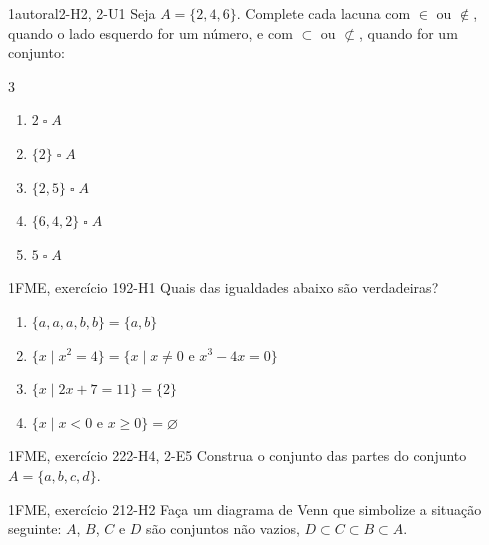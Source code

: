 \Questoes

\begin{questao}{1}{autoral}{2-H2, 2-U1}\label{u2:completar}
Seja $A=\{2,4,6\}$. Complete cada lacuna com $\in$ ou $\notin$, quando o lado esquerdo for um número, e com $\subset$ ou $\not\subset$, quando for um conjunto:
\begin{multicols}{3}
\begin{enumerate}[label=\alph*)]
  \item $2\;\square\;A$
  \item $\{2\}\;\square\;A$
  \item $\{2,5\}\;\square\;A$
  \item $\{6,4,2\}\;\square\;A$
  \item $5\;\square\;A$
\end{enumerate}
\end{multicols}
\end{questao}

\begin{questao}{1}{FME, exercício 19}{2-H1}\label{u2:fme19}
Quais das igualdades abaixo são verdadeiras?
\begin{enumerate}[label=\alph*)]
  \item $\{a,a,a,b,b\}=\{a,b\}$
  \item $\{x\mid x^2=4\}=\{x\mid x\neq0\text{ e }x^3-4x=0\}$
  \item $\{x\mid 2x+7=11\}=\{2\}$
  \item $\{x\mid x<0\text{ e }x\ge0\}=\varnothing$
\end{enumerate}
\end{questao}

\begin{questao}{1}{FME, exercício 22}{2-H4, 2-E5}\label{u2:fme22}
Construa o conjunto das partes do conjunto $A=\{a,b,c,d\}$.
\end{questao}

\begin{questao}{1}{FME, exercício 21}{2-H2}\label{u2:fme21}
Faça um diagrama de Venn que simbolize a situação seguinte: $A$, $B$, $C$ e $D$ são conjuntos não vazios, $D\subset C\subset B\subset A$.
\end{questao}

